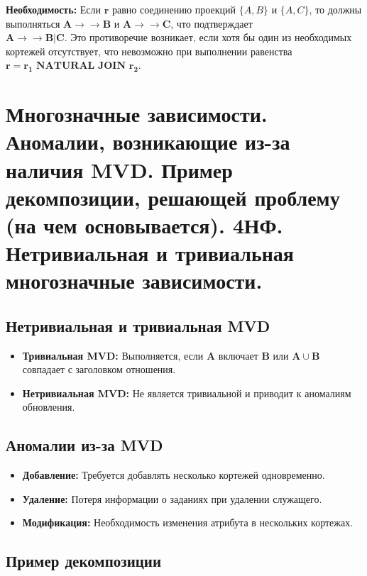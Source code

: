 \documentclass[a4paper,12pt]{article}
\begin{document}
\textbf{Необходимость:}  
Если \(\mathbf{r}\) равно соединению проекций \(\{A, B\}\) и \(\{A, C\}\), то должны выполняться \(\mathbf{A \rightarrow\rightarrow B}\) и \(\mathbf{A \rightarrow\rightarrow C}\), что подтверждает \\ \(\mathbf{A \rightarrow\rightarrow B | C}\). Это противоречие возникает, если хотя бы один из необходимых кортежей отсутствует, что невозможно при выполнении равенства \(\mathbf{r = r_1 \text{ NATURAL JOIN } r_2}\).
    
\section{Многозначные зависимости. Аномалии, возникающие из-за наличия MVD. Пример декомпозиции, решающей проблему (на чем основывается). 4НФ. Нетривиальная и тривиальная многозначные зависимости.}

\subsection{Нетривиальная и тривиальная MVD}

\begin{itemize}
    \item \textbf{Тривиальная MVD:} Выполняется, если \textbf{A} включает \textbf{B} или \(\mathbf{A \cup B}\) совпадает с заголовком отношения.
    \item \textbf{Нетривиальная MVD:} Не является тривиальной и приводит к аномалиям обновления.
\end{itemize}

\subsection{Аномалии из-за MVD}

\begin{itemize}
    \item \textbf{Добавление:} Требуется добавлять несколько кортежей одновременно.
    \item \textbf{Удаление:} Потеря информации о заданиях при удалении служащего.
    \item \textbf{Модификация:} Необходимость изменения атрибута в нескольких кортежах.
\end{itemize}

\subsection{Пример декомпозиции}
\end{document}
